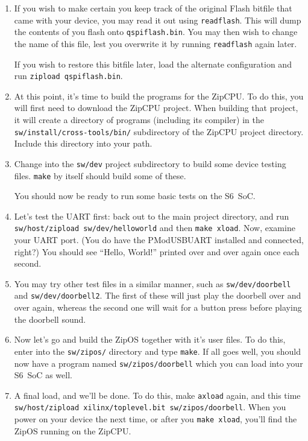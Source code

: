 \documentclass{gqtekspec}
\begin{document}
\begin{enumerate}
\item If you wish to make certain you keep track of the original Flash bitfile
	that came with your device, you may read it out using {\tt readflash}.
	This will dump the contents of you flash onto {\tt qspiflash.bin}.
	You may then wish to change the name of this file, lest you overwrite
	it by running {\tt readflash} again later.

	If you wish to restore this bitfile later, load the alternate
	configuration and run {\tt zipload qspiflash.bin}.

\item At this point, it's time to build the programs for the ZipCPU.  To do
	this, you will first need to download the ZipCPU project.  When
	building that project, it will create a directory of programs
	(including its compiler) in the {\tt sw/install/cross-tools/bin/}
	subdirectory of the ZipCPU project directory.
	Include this directory into your path.

\item Change into the {\tt sw/dev} project subdirectory to build some device
	testing files.  {\tt make} by itself should build some of these.

	You should now be ready to run some basic tests on the S6~SoC.

\item Let's test the UART first: back out to the main project directory,
	and run\break
	{\tt sw/host/zipload sw/dev/helloworld} and then {\tt make xload}.
	Now, examine your UART port.  (You do have the PModUSBUART installed
	and connected, right?)  You should see ``Hello, World!'' printed
	over and over again once each second.

\item You may try other test files in a similar manner, such as
	{\tt sw/dev/doorbell} and\break
	{\tt sw/dev/doorbell2}.  The first of these will just play the
	doorbell over and over again, whereas the second one will wait for a
	button press before playing the doorbell sound.

\item Now let's go and build the ZipOS together with it's user files.  To do
	this, enter into the {\tt sw/zipos/} directory and type
	{\tt make}.  If all goes well, you should now have a program named
	{\tt sw/zipos/doorbell} which you can load into your S6~SoC as
	well.

\item A final load, and we'll be done.  To do this, make {\tt axload} again,
	and this time
	{\tt sw/host/zipload xilinx/toplevel.bit sw/zipos/doorbell}.
	When you power on your device the next time, or after you
	{\tt make xload}, you'll find the ZipOS running on the ZipCPU.


\end{enumerate}
\end{document}
